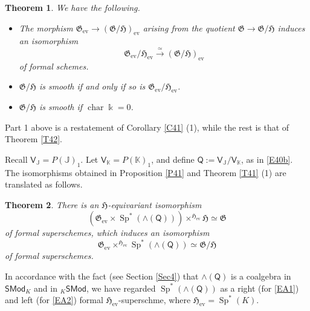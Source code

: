 \documentclass[11pt, a4paper]{amsart}
\newtheorem{theorem}{Theorem}[section]
\theoremstyle{definition}
\numberwithin{equation}{section}
\begin{document}
\begin{theorem}\label{TA1}
We have the following.
\begin{itemize}
\item[(1)] The morphism $\mathfrak{G}_{\operatorname{ev}}\to (\mathfrak{G}/\mathfrak{H})_{\operatorname{ev}}$
arising from the quotient $\mathfrak{G}\to \mathfrak{G}/\mathfrak{H}$ induces an isomorphism
\[
\mathfrak{G}_{\operatorname{ev}}/\mathfrak{H}_{\operatorname{ev}}
\overset{\simeq}{\longrightarrow}
 (\mathfrak{G}/\mathfrak{H})_{\operatorname{ev}}
\]
of formal schemes.
\item[(2)]
$\mathfrak{G}/\mathfrak{H}$ is smooth if and only if so is $\mathfrak{G}_{\operatorname{ev}}/\mathfrak{H}_{\operatorname{ev}}$.
\item[(3)]
$\mathfrak{G}/\mathfrak{H}$ is smooth if $\operatorname{char} \Bbbk=0$.  
\end{itemize}
\end{theorem}

Part 1 above is a restatement of Corollary \ref{C41} (1), while the rest is that of Theorem \ref{T42}. 

Recall $\mathsf{V}_{\mathbb{J}}=P(\mathbb{J})_1$. Let $\mathsf{V}_{\mathbb{K}}=P(\mathbb{K})_1$, and 
define $\mathsf{Q}:=\mathsf{V}_{\mathbb{J}}/\mathsf{V}_{\mathbb{K}}$, as in \eqref{E40b}. 
The isomorphisms obtained in Proposition \ref{P41} and Theorem \ref{T41} (1) are translated as follows. 

\begin{theorem}\label{TA2}
There is an $\mathfrak{H}$-equivariant isomorphism
\begin{equation}\label{EA1}
(\mathfrak{G}_{\operatorname{ev}}\times \operatorname{Sp}^*(\wedge(\mathsf{Q})))\times
^{\mathfrak{H}_{\operatorname{ev}}}\mathfrak{H}\simeq \mathfrak{G}
\end{equation}
of formal superschemes, which induces an isomorphism 
\begin{equation}\label{EA2}
\mathfrak{G}_{\operatorname{ev}}\times^{\mathfrak{H}_{\operatorname{ev}}} \operatorname{Sp}^*(\wedge(\mathsf{Q}))\simeq \mathfrak{G}/\mathfrak{H}
\end{equation}
of formal superschemes. 
\end{theorem}

In accordance with the fact (see Section \ref{Sec4}) that $\wedge(\mathsf{Q})$ is a coalgebra in $\mathsf{SMod}_K$
and in ${}_K\mathsf{SMod}$,  
we have regarded $\operatorname{Sp}^*(\wedge(\mathsf{Q}))$ as a right (for \eqref{EA1}) and left (for \eqref{EA2})
formal $\mathfrak{H}_{\operatorname{ev}}$-superschme,
where $\mathfrak{H}_{\operatorname{ev}}=\operatorname{Sp}^*(K)$.
\end{document}

